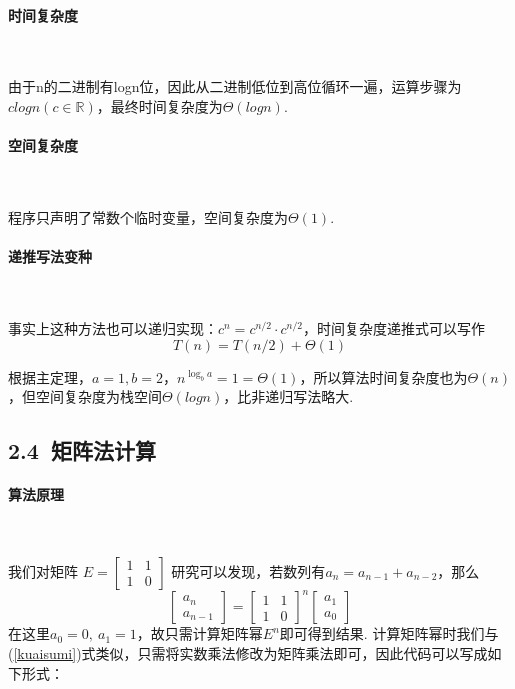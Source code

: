\documentclass[UTF8]{ctexart}
\begin{document}
\paragraph{时间复杂度}\ \par
由于n的二进制有logn位，因此从二进制低位到高位循环一遍，运算步骤为$clogn(c\in \mathbb{R})$，最终时间复杂度为$\Theta(logn)$.\par
\paragraph{空间复杂度}\ \par
程序只声明了常数个临时变量，空间复杂度为$\Theta(1)$.
\paragraph{递推写法变种}\ \par

事实上这种方法也可以递归实现：$c^n=c^{n/2}\cdot c^{n/2}$，时间复杂度递推式可以写作
\begin{equation}T(n)=T(n/2)+\Theta(1)\end{equation}\par
根据主定理，$a=1, b=2$，$n^{\log_ba}=1=\Theta(1)$，所以算法时间复杂度也为$\Theta(n)$，但空间复杂度为栈空间$\Theta(logn)$，比非递归写法略大.

\subsection*{2.4\ 矩阵法计算}
\paragraph{算法原理}\ \par
我们对矩阵
$E=\begin{bmatrix}1&1\\1&0\end{bmatrix}$
研究可以发现，若数列有$a_n=a_{n-1}+a_{n-2}$，那么$$
\begin{bmatrix}a_n\\a_{n-1}\end{bmatrix}=
\begin{bmatrix}1&1\\1&0\end{bmatrix}^n\begin{bmatrix}a_1\\a_0\end{bmatrix}$$
在这里$a_0=0,\ a_1=1$，故只需计算矩阵幂$E^n$即可得到结果. 计算矩阵幂时我们与(\ref{kuaisumi})式类似，只需将实数乘法修改为矩阵乘法即可，因此代码可以写成如下形式：
\end{document}
